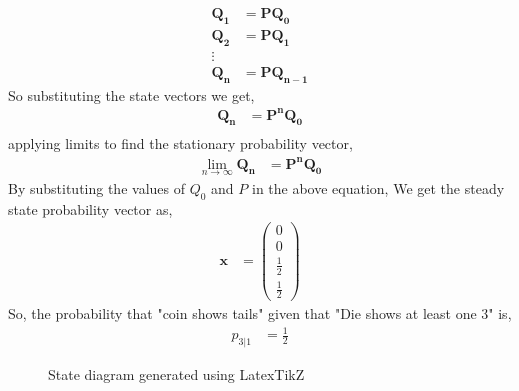 \documentclass[journal,12pt,two column]{IEEEtran}
\newcommand{\myvec}[1]{\ensuremath{\begin{pmatrix}#1\end{pmatrix}}}
\let\vec\mathbf
\begin{document}
\begin{align}
    \vec{Q_1}&=\vec{P Q_0}\\
    \vec{Q_2}&=\vec{P Q_1}\\
    \vdots\\
    \vec{Q_{n}}&=\vec{P Q_{n-1}}
\end{align}
So substituting the state vectors we get,
\begin{align}
    \vec{Q_{n}}&=\vec{P^n Q_0}\\
\end{align}
applying limits to find the stationary probability vector,
\begin{align}
     \lim_{n \to \infty} \vec{Q_{n}}&=\vec{P^n Q_0}
\end{align} \label{eq:steady}
By substituting the values of $Q_0$ and $P$ in the above equation, We get the steady state probability vector as,
\begin{align}
    \vec{x}&=\myvec{0\\0\\\frac{1}{2}\\\frac{1}{2}}
\end{align}
So, the probability that "coin shows tails" given that "Die shows at least one 3" is,
\begin{align}
    p_{3|1} &= \frac{1}{2}
\end{align}
\begin{figure}[ht!]
    \centering
    \resizebox{.9\linewidth}{!}{}
    \caption{State diagram generated using LatexTikZ}
    \label{fig:Statediagramdiecoin}
\end{figure}
\end{document}
